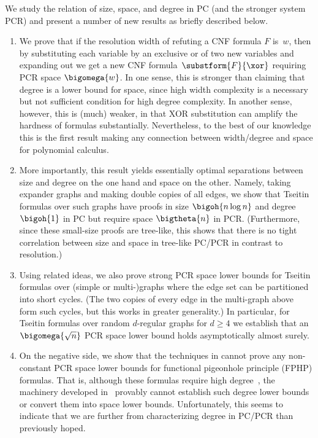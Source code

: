 \documentclass{toc}
\begin{document}
We study the relation of size, space, and degree in PC (and the 
stronger system PCR) and present
a number of new results as 
briefly described below.
%
\begin{enumerate}
  \item We prove that if the resolution width of refuting a CNF
  formula $F$ is~$w$, then by substituting each variable by an
  exclusive or of two new variables and expanding out we get a new CNF
  formula~$\substform{F}{\xor}$ requiring PCR space $\bigomega{w}$.
  In one sense, this is stronger than claiming that degree is a lower
  bound for space, since high width complexity is a necessary but not
  sufficient condition for high degree complexity. In another sense,
  however, this is (much) weaker, in that XOR substitution can amplify
  the hardness of formulas substantially. Nevertheless, to the best of
  our knowledge this is the first result making any connection between
  width/degree and space for polynomial calculus.%

\item
  More importantly, this result yields essentially optimal
  separations between size and degree on the one hand and space on
  the other. Namely, taking expander graphs and making
  double copies of all edges, we show that Tseitin formulas
  over such graphs
  have proofs in size $\bigoh{n \log n }$ and
  \mbox{degree $\bigoh{1}$} in PC but require
  space $\bigtheta{n}$ in PCR.
  (Furthermore, since these small-size proofs are tree-like, this
  shows that there is no tight correlation between size and space in
  tree-like PC/PCR in contrast to
  resolution.)

\item
  Using related ideas, we also prove strong PCR space
  lower bounds for Tseitin formulas over 
  (simple or \mbox{multi-)graphs}
%
  where the edge set can be partitioned into %
  short  %
  cycles.
  (The two copies of every edge in the multi-graph above form such
  cycles, but this works in greater generality.)
  In particular, for Tseitin formulas over random $d$-regular graphs
  for $d \geq 4$ we establish that \mbox{an $\bigomega{\sqrt{n}}$} PCR
  space lower bound holds asymptotically almost surely.%

\item
  On the negative side, we show that the
  techniques in
  \cite{BG15Framework}
  cannot prove any non-constant PCR space lower bounds for
  functional pigeonhole principle (FPHP) formulas.
  That is, although these formulas require high 
  degree~\cite{MN15GeneralizedMethodDegree},
  the machinery developed in~\cite{BG15Framework}
  provably cannot establish such degree lower bounds or convert them
  into space lower bounds.
  Unfortunately, this seems to indicate that we are further from
  characterizing degree in PC/PCR than previously hoped.
\end{enumerate}
\end{document}
